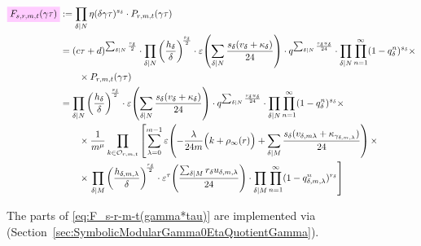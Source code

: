 \documentclass{article}
\begin{document}
\begin{Hemmecke}
\begin{align}
  \defineNotation[F-s-r-m-t-gamma-tau]{F_{s,r,m,t}(\gamma\tau)}
  &:= \divisorprod{N} \eta(\delta\gamma\tau)^{s_\delta}
    \cdot
    P_{r, m, t}(\gamma\tau)
  \notag\\
  &=
  (c\tau+d)^{\divisorsum{N} \frac{s_\delta}{2}}
  \cdot
  \divisorprod{N}
  \left(\frac{h_\delta}{\delta}\right)^{\!\frac{s_\delta}{2}}
  \cdot
  \unityPower{\divisorsum{N} \frac{s_\delta(v_\delta + \kappa_\delta)}{24}}
  \cdot
  q^{\divisorsum{N} \frac{s_\delta u_\delta}{24}}
  \cdot
    \divisorprod{N} \prod_{n=1}^{\infty}(1-q_\delta^n)^{s_\delta} \times\notag\\
  &\qquad\times
    P_{r, m, t}(\gamma\tau)
  \notag\\
  &=
  \divisorprod{N}
  \left(\frac{h_\delta}{\delta}\right)^{\!\frac{s_\delta}{2}}
  \cdot
  \unityPower{\divisorsum{N} \frac{s_\delta(v_\delta + \kappa_\delta)}{24}}
  \cdot
  q^{\divisorsum{N} \frac{s_\delta u_\delta}{24}}
    \cdot
    \divisorprod{N} \prod_{n=1}^{\infty}(1-q_\delta^n)^{s_\delta} \times\notag\\
  &\qquad\times
    \frac{1}{m^\mu}
    \prod_{k\in \modularOrbit{r,m,t}}
    \left[\sum_{\lambda=0}^{m-1}
    \unityPower{-\frac{\lambda}{24m}\Bigl(k+\rho_\infty(r)\Bigr)
    + \divisorsum{M}\frac{s_\delta(v_{\delta,m\lambda} +
    \kappa_{\gamma_{\delta,m,\lambda}})}{24}} \times\right.\notag\\
  &\qquad\times
    \left.
    \divisorprod{M}
    \left(\frac{h_{\delta,m,\lambda}}{\delta}\right)^{\!\frac{r_\delta}{2}}
    \cdot
    \unityPowerTau{\frac{\divisorsum{M} r_\delta u_{\delta,m,\lambda}}{24}}
    \cdot
    \divisorprod{M} \prod_{n=1}^\infty (1-q_{\delta,m,\lambda}^n)^{r_\delta}
    \right]
    \label{eq:F_s-r-m-t(gamma*tau)}
\end{align}


The parts of \eqref{eq:F_s-r-m-t(gamma*tau)} are implemented via
\textcolor{blue}{}
(Section~\ref{sec:SymbolicModularGamma0EtaQuotientGamma}).









\end{Hemmecke}
\end{document}
